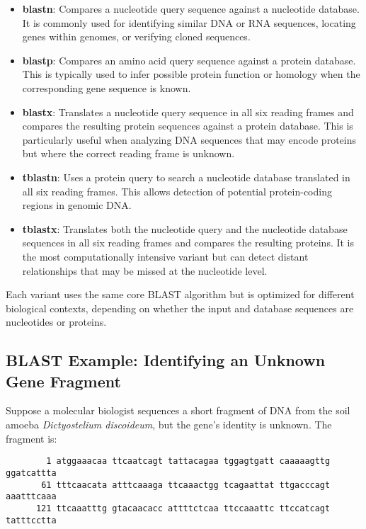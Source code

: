 \begin{itemize}
    \item \textbf{blastn}: Compares a nucleotide query sequence against a nucleotide database. It is commonly used for identifying similar DNA or RNA sequences, locating genes within genomes, or verifying cloned sequences.
    
    \item \textbf{blastp}: Compares an amino acid query sequence against a protein database. This is typically used to infer possible protein function or homology when the corresponding gene sequence is known.
    
    \item \textbf{blastx}: Translates a nucleotide query sequence in all six reading frames and compares the resulting protein sequences against a protein database. This is particularly useful when analyzing DNA sequences that may encode proteins but where the correct reading frame is unknown.
    
    \item \textbf{tblastn}: Uses a protein query to search a nucleotide database translated in all six reading frames. This allows detection of potential protein-coding regions in genomic DNA.
    
    \item \textbf{tblastx}: Translates both the nucleotide query and the nucleotide database sequences in all six reading frames and compares the resulting proteins. It is the most computationally intensive variant but can detect distant relationships that may be missed at the nucleotide level.
\end{itemize}

Each variant uses the same core BLAST algorithm but is optimized for different biological contexts, depending on whether the input and database sequences are nucleotides or proteins.

\subsection{BLAST Example: Identifying an Unknown Gene Fragment}

Suppose a molecular biologist sequences a short fragment of DNA from the soil amoeba \textit{Dictyostelium discoideum}, but the gene’s identity is unknown. The fragment is:

\begin{verbatim}
        1 atggaaacaa ttcaatcagt tattacagaa tggagtgatt caaaaagttg ggatcattta
       61 tttcaacata atttcaaaga ttcaaactgg tcagaattat ttgacccagt aaatttcaaa
      121 ttcaaatttg gtacaacacc attttctcaa ttccaaattc ttccatcagt tatttcctta
\end{verbatim}

